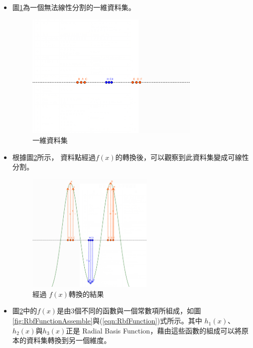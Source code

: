 \begin{itemize}
	\item

	      圖\ref{fig:RbfIntroductionNotTransfer}為一個無法線性分割的一維資料集。



	      \begin{figure}[h]
		      \centering
		      \includegraphics[height=6cm]{./pic/vM4xT9rm.png}
		      \caption{一維資料集}
		      \label{fig:RbfIntroductionNotTransfer}
	      \end{figure}

	\item
		  根據圖\ref{fig:RbfWithFunction}所示， 資料點經過\(f(x)\)的轉換後，可以觀察到此資料集變成可線性分割。

	      \begin{figure}[h]
		      \centering
		      \includegraphics[width=6cm]{./pic/7VM3Lid5.png}
		      \caption{經過 \(f(x)\)轉換的結果 }
		      \label{fig:RbfWithFunction}
	      \end{figure}


	\item
		圖\ref{fig:RbfWithFunction}中的\(f(x)\)是由3個不同的函數與一個常數項所組成，如圖\ref{fig:RbfFunctionAssemble}與(\ref{eqn:RbfFunction})式所示。其中 \(h_1(x)\)、\(h_2(x)\)與\(h_3(x)\)正是 Radial Basis Function，藉由這些函數的組成可以將原本的資料集轉換到另一個維度。


\end{itemize}
